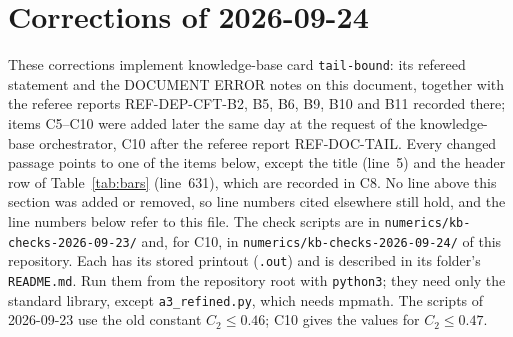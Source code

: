 \documentclass[11pt]{article}
\begin{document}
\section{Corrections of 2026-09-24}

These corrections implement knowledge-base card \texttt{tail-bound}: its refereed statement and the
DOCUMENT ERROR notes on this document, together with the referee reports REF-DEP-CFT-B2, B5, B6, B9,
B10 and B11 recorded there; items C5--C10 were added later the same day at the request of the
knowledge-base orchestrator, C10 after the referee report REF-DOC-TAIL.  Every changed passage points to one of the items below, except the
title (line~5) and the header row of Table~\ref{tab:bars} (line~631), which are recorded in C8.  No line
above this section was added or removed, so line numbers cited elsewhere still hold, and the line
numbers below refer to this file.  The check scripts are in \nolinkurl{numerics/kb-checks-2026-09-23/}
and, for C10, in \nolinkurl{numerics/kb-checks-2026-09-24/} of this repository.  Each has its stored
printout (\texttt{.out}) and is described in its folder's \texttt{README.md}.  Run them from the
repository root with \texttt{python3}; they need only the standard library, except
\texttt{a3\_refined.py}, which needs mpmath.  The scripts of 2026-09-23 use the old constant
$C_2\le0.46$; C10 gives the values for $C_2\le0.47$.
\end{document}
